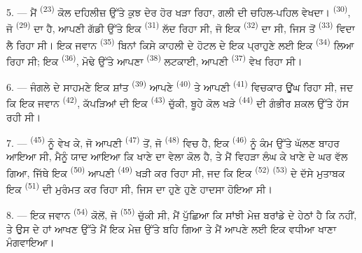 5. --- ਮੈਂ  \textsuperscript{(23)} ਕੋਲ ਦਹਿਲੀਜ਼ ਉੱਤੇ ਕੁਝ ਦੇਰ
ਹੋਰ ਖੜਾ ਰਿਹਾ, ਗਲੀ ਦੀ ਚਹਿਲ-ਪਹਿਲ ਵੇਖਦਾ।  \textsuperscript{(30)}, ਜੋ
 \textsuperscript{(29)} ਦਾ ਹੈ, ਆਪਣੀ ਗੱਡੀ ਉੱਤੇ ਇਕ 
\textsuperscript{(31)} ਲੱਦ ਰਿਹਾ ਸੀ, ਜੋ ਇਕ  \textsuperscript{(32)} ਦਾ
ਸੀ, ਜਿਸ ਤੋਂ  \textsuperscript{(33)} ਵਿਦਾ ਲੈ ਰਿਹਾ ਸੀ। ਇਕ ਜਵਾਨ
 \textsuperscript{(35)} ਬਿਨਾਂ ਕਿਸੇ ਕਾਹਲੀ ਦੇ ਹੋਟਲ ਦੇ ਇਕ
ਪ੍ਰਾਹੁਣੇ ਲਈ ਇਕ  \textsuperscript{(34)} ਲਿਆ ਰਿਹਾ ਸੀ; ਇਕ
 \textsuperscript{(36)}, ਮੋਢੇ ਉੱਤੇ ਆਪਣਾ 
\textsuperscript{(38)} ਲਟਕਾਈ, ਆਪਣੀ  \textsuperscript{(37)} ਵੇਖ ਰਿਹਾ
ਸੀ।

\VUsaut{4.0mm}
\VUsaut{3.0mm}

6. --- ਜੰਗਲੇ ਦੇ ਸਾਹਮਣੇ ਇਕ ਸ਼ਾਂਤ  \textsuperscript{(39)} ਆਪਣੇ
 \textsuperscript{(40)} ਤੇ ਆਪਣੀ 
\textsuperscript{(41)} ਵਿਚਕਾਰ ਊਂਘ ਰਿਹਾ ਸੀ, ਜਦ ਕਿ ਇਕ ਜਵਾਨ 
\textsuperscript{(42)}, ਕੱਪੜਿਆਂ ਦੀ ਇਕ  \textsuperscript{(43)} ਚੁੱਕੀ,
ਬੂਹੇ ਕੋਲ ਖੜੇ  \textsuperscript{(44)} ਦੀ ਗੰਭੀਰ ਸ਼ਕਲ ਉੱਤੇ ਹੱਸ ਰਹੀ ਸੀ।

7. ---  \textsuperscript{(45)} ਨੂੰ ਵੇਖ ਕੇ, ਜੋ ਆਪਣੀ 
\textsuperscript{(47)} ਤੋਂ, ਜੋ  \textsuperscript{(48)} ਵਿਚ ਹੈ, ਇਕ
 \textsuperscript{(46)} ਨੂੰ ਕੰਮ ਉੱਤੇ ਘੱਲਣ ਬਾਹਰ ਆਇਆ ਸੀ, ਮੈਨੂੰ
ਯਾਦ ਆਇਆ ਕਿ ਖਾਣੇ ਦਾ ਵੇਲਾ ਕੋਲ ਹੈ, ਤੇ ਮੈਂ ਵਿਹੜਾ ਲੰਘ ਕੇ ਖਾਣੇ ਦੇ ਘਰ ਵੱਲ ਗਿਆ, ਜਿੱਥੇ ਇਕ
 \textsuperscript{(50)} ਆਪਣੀ  \textsuperscript{(49)}
ਖੜੀ ਕਰ ਰਿਹਾ ਸੀ, ਜਦ ਕਿ ਇਕ  \textsuperscript{(52)}
 \textsuperscript{(53)} ਦੇ ਦੱਸੇ ਮੁਤਾਬਕ ਇਕ 
\textsuperscript{(51)} ਦੀ ਮੁਰੰਮਤ ਕਰ ਰਿਹਾ ਸੀ, ਜਿਸ ਦਾ ਹੁਣੇ ਹੁਣੇ ਹਾਦਸਾ ਹੋਇਆ ਸੀ।

8. --- ਇਕ ਜਵਾਨ  \textsuperscript{(54)} ਕੋਲੋਂ, ਜੋ
 \textsuperscript{(55)} ਚੁੱਕੀ ਸੀ, ਮੈਂ ਪੁੱਛਿਆ ਕਿ ਸਾਂਝੀ ਮੇਜ਼
ਬਰਾਂਡੇ ਦੇ ਹੇਠਾਂ ਹੈ ਕਿ ਨਹੀਂ, ਤੇ ਉਸ ਦੇ ਹਾਂ ਆਖਣ ਉੱਤੇ ਮੈਂ ਇਕ ਮੇਜ਼ ਉੱਤੇ ਬਹਿ ਗਿਆ ਤੇ ਮੈਂ
ਆਪਣੇ ਲਈ ਇਕ ਵਧੀਆ ਖਾਣਾ ਮੰਗਵਾਇਆ।


\VUsaut{4.0mm}
\VUsaut{3.0mm}

